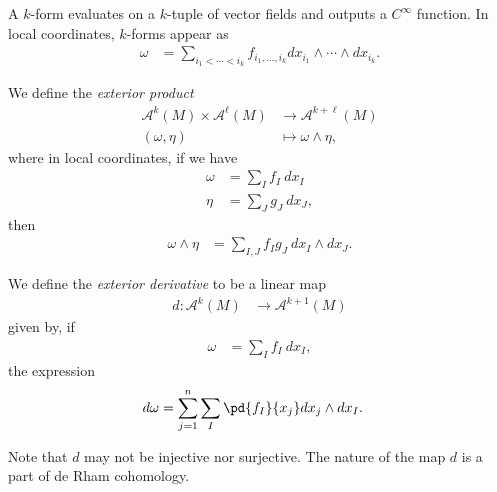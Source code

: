 \documentclass[10pt]{mypackage}
\begin{document}
A $k$-form evaluates on a $k$-tuple of vector fields and outputs a $C^{\infty}$ function. In local coordinates, $k$-forms appear as
\begin{align*}
  \omega &= \sum_{i_1 < \cdots < i_k} f_{i_1,\dots,i_k} dx_{i_1}\wedge\cdots\wedge dx_{i_k}.
\end{align*}
\begin{definition}
  We define the \textit{exterior product}
  \begin{align*}
    \mathcal{A}^{k}\left( M \right)\times \mathcal{A}^{\ell}\left( M \right) &\rightarrow \mathcal{A}^{k + \ell}\left( M \right)\\
    \left( \omega,\eta \right) &\mapsto \omega\wedge \eta,
  \end{align*}
  where in local coordinates, if we have
  \begin{align*}
    \omega &= \sum_{I}f_I\:dx_I\\
    \eta &= \sum_{J}g_J\:dx_J,
  \end{align*}
  then
  \begin{align*}
    \omega\wedge\eta &= \sum_{I,J}f_Ig_J\:dx_I\wedge dx_J.
  \end{align*}
\end{definition}
\begin{definition}
  We define the \textit{exterior derivative} to be a linear map
  \begin{align*}
    d\colon \mathcal{A}^{k}\left( M \right)&\rightarrow \mathcal{A}^{k+1}\left( M \right)
  \end{align*}
  given by, if
  \begin{align*}
    \omega &= \sum_{I}f_I\:dx_I,
  \end{align*}
  the expression
  \begin{align*}
    d\omega &= \sum_{j=1}^{n}\sum_{I} \pd{f_I}{x_j}dx_j\wedge dx_I.
  \end{align*}
\end{definition}
\begin{remark}
  Note that $d$ may not be injective nor surjective. The nature of the map $d$ is a part of de Rham cohomology.
\end{remark}
\end{document}
